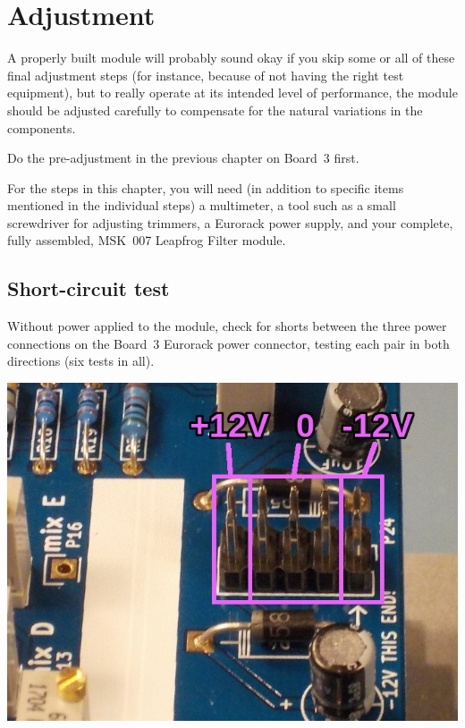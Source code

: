 
%
%
%
%
%
%

\chapter{Adjustment}

A properly built module will probably sound okay if you skip some or all of
these final adjustment steps (for instance, because of not having the right
test equipment), but to really operate at its intended level of performance,
the module should be adjusted carefully to compensate for the natural
variations in the components.

Do the pre-adjustment in the previous chapter on Board~3 first.

For the steps in this chapter, you will need (in addition to specific items
mentioned in the individual steps) a multimeter, a tool such as a small
screwdriver for adjusting trimmers, a Eurorack power supply, and your
complete, fully assembled, MSK~007 Leapfrog Filter module.

\section{Short-circuit test}

Without power applied to the module, check for shorts between the three
power connections on the Board~3 Eurorack power connector, testing each pair
in both directions (six tests in all).

\noindent\includegraphics[width=\linewidth]{power-pinout.jpg}

